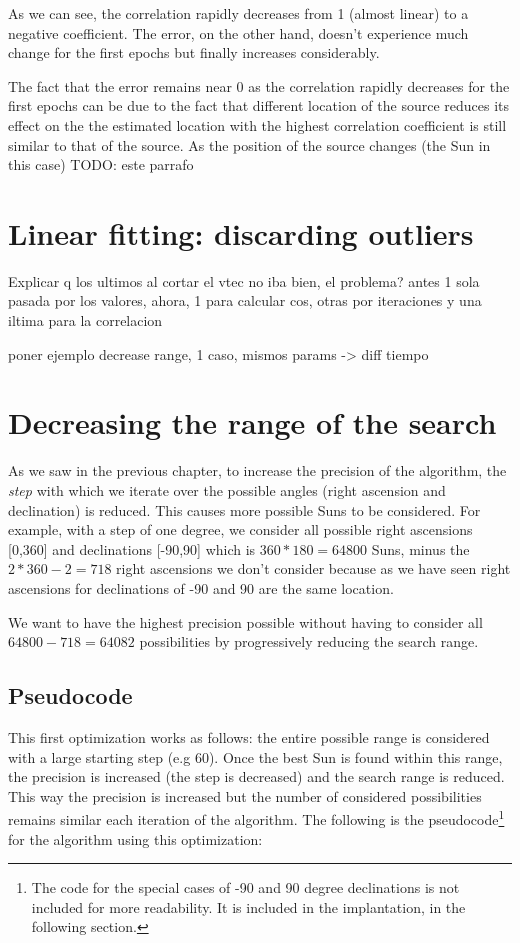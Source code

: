 As we can see, the correlation rapidly decreases from 1 (almost linear) to a negative coefficient. The error, on the other hand, doesn't experience much change for the first epochs but finally increases considerably. 

The fact that the error remains near 0 as the correlation rapidly decreases for the first epochs can be due to the fact that different location of the source reduces its effect on the  the estimated location with the highest correlation coefficient is still similar to that of the source. As the position of the source changes (the Sun in this case)  TODO: este parrafo

\section{Linear fitting: discarding outliers}

Explicar q los ultimos al cortar el vtec no iba bien, el problema? antes 1 sola pasada por los valores, ahora, 1 para calcular cos, otras por iteraciones y una iltima para la correlacion

poner ejemplo decrease range, 1 caso, mismos params -> diff tiempo

\section{Decreasing the range of the search}

As we saw in the previous chapter, to increase the precision of the algorithm, the \textit{step} with which we iterate over the possible angles (right ascension and declination) is reduced. This causes more possible Suns to be considered. For example, with a step of one degree, we consider all possible right ascensions [0,360] and declinations [-90,90] which is  $360*180 = 64800$ Suns, minus the $2*360 - 2 = 718$ right ascensions we don't consider because as we have seen right ascensions for declinations of -90 and 90 are the same location.

We want to have the highest precision possible without having to consider all $64800 - 718 = 64082$ possibilities by progressively reducing the search range. 

\subsection{Pseudocode}

This first optimization works as follows: the entire possible range is considered with a large starting step (e.g 60). Once the best Sun is found within this range, the precision is increased (the step is decreased) and the search range is reduced. This way the precision is increased but the number of considered possibilities remains similar each iteration of the algorithm. The following is the pseudocode\footnote{The code for the special cases of -90 and 90 degree declinations is not included for more readability. It is included in the implantation, in the following section.} for the algorithm using this optimization:

